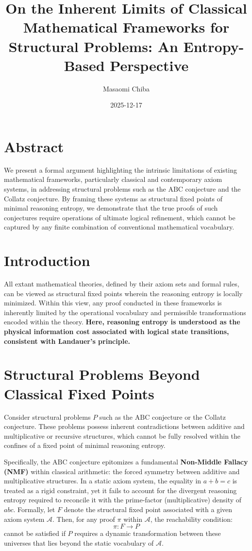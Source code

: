 \documentclass[12pt]{article}
\title{On the Inherent Limits of Classical Mathematical Frameworks for Structural Problems: An Entropy-Based Perspective}
\author{Masaomi Chiba}
\date{2025-12-17}
\begin{document}
\maketitle

\section*{Abstract}
We present a formal argument highlighting the intrinsic limitations of existing mathematical frameworks, particularly classical and contemporary axiom systems, in addressing structural problems such as the $\mathrm{ABC}$ conjecture and the Collatz conjecture. By framing these systems as structural fixed points of minimal reasoning entropy, we demonstrate that the true proofs of such conjectures require operations of ultimate logical refinement, which cannot be captured by any finite combination of conventional mathematical vocabulary.

\section{Introduction}
All extant mathematical theories, defined by their axiom sets and formal rules, can be viewed as structural fixed points wherein the reasoning entropy is locally minimized. Within this view, any proof conducted in these frameworks is inherently limited by the operational vocabulary and permissible transformations encoded within the theory. \textbf{Here, reasoning entropy is understood as the physical information cost associated with logical state transitions, consistent with Landauer's principle.}

\section{Structural Problems Beyond Classical Fixed Points}
Consider structural problems $P$ such as the $\mathrm{ABC}$ conjecture or the Collatz conjecture. These problems possess inherent contradictions between additive and multiplicative or recursive structures, which cannot be fully resolved within the confines of a fixed point of minimal reasoning entropy. 

Specifically, the $\mathrm{ABC}$ conjecture epitomizes a fundamental \textbf{Non-Middle Fallacy (NMF)} within classical arithmetic: the forced symmetry between additive and multiplicative structures. In a static axiom system, the equality in $a + b = c$ is treated as a rigid constraint, yet it fails to account for the divergent reasoning entropy required to reconcile it with the prime-factor (multiplicative) density of $abc$. Formally, let $F$ denote the structural fixed point associated with a given axiom system $\mathcal{A}$. Then, for any proof $\pi$ within $\mathcal{A}$, the reachability condition:
\[
\pi: F \rightarrow P
\]
cannot be satisfied if $P$ requires a dynamic transformation between these universes that lies beyond the static vocabulary of $\mathcal{A}$.
\end{document}
